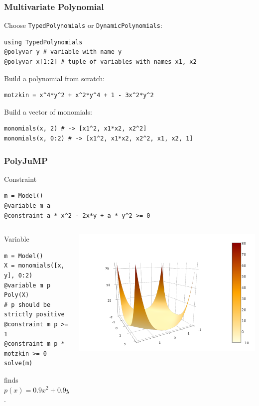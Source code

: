 \documentclass{beamer}
\begin{document}
  \begin{frame}[fragile]
    \frametitle{Multivariate Polynomial}
    Choose \verb|TypedPolynomials| or \verb|DynamicPolynomials|:
\begin{verbatim}
using TypedPolynomials
@polyvar y # variable with name y
@polyvar x[1:2] # tuple of variables with names x1, x2
\end{verbatim}
    Build a polynomial from scratch:
\begin{verbatim}
motzkin = x^4*y^2 + x^2*y^4 + 1 - 3x^2*y^2
\end{verbatim}
    Build a vector of monomials:
\begin{verbatim}
monomials(x, 2) # -> [x1^2, x1*x2, x2^2]
monomials(x, 0:2) # -> [x1^2, x1*x2, x2^2, x1, x2, 1]
\end{verbatim}
  \end{frame}
  \begin{frame}[fragile]
    \frametitle{PolyJuMP}
    \begin{block}{Constraint}
\begin{verbatim}
m = Model()
@variable m a
@constraint a * x^2 - 2x*y + a * y^2 >= 0
\end{verbatim}
    \end{block}
      \vspace{-1em}
    \begin{columns}
      \begin{column}{0.6\textwidth}
    \begin{block}{Variable}
      \vspace{-.5em}
\begin{verbatim}
m = Model()
X = monomials([x, y], 0:2)
@variable m p Poly(X)
# p should be strictly positive
@constraint m p >= 1
@constraint m p * motzkin >= 0
solve(m)
\end{verbatim}
      \vspace{-.5em}
    finds $p(x) = 0.9x^2 + 0.9y^2 + 2$.
    \end{block}
      \end{column}
      \begin{column}{0.4\textwidth}
        \centering
        \includegraphics[trim=3cm .7cm 6cm 3cm, clip, width=\textwidth]{motzkin.png}
      \end{column}
    \end{columns}
  \end{frame}
\end{document}
